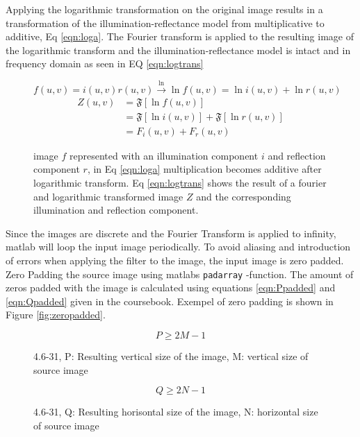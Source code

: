 Applying the logarithmic transformation on the original image results in a transformation of the illumination-reflectance model from multiplicative to additive, Eq \ref{eqn:loga}. The Fourier transform is applied to the resulting image of the logarithmic transform and the illumination-reflectance model is intact and in frequency domain as seen in EQ \ref{eqn:logtrans}
\begin{figure}[h!]
\begin{equation}
  f(u,v) = i(u,v) r(u,v) \xrightarrow{\ln} \ln{f(u,v)} = \ln{i(u,v)} + \ln{r(u,v)} 
  \label{eqn:loga}
\end{equation}
  \begin{equation}
    \begin{split}
      Z(u,v) &= \mathfrak{F} [\ln{f(u,v)}]\\ &= \mathfrak{F}[\ln{i(u,v)}] + \mathfrak{F}[\ln{r(u,v)}]\\ &= F_i(u,v) + F_r(u,v)
    \end{split}
    \label{eqn:logtrans}
  \end{equation}
\caption{image $f$ represented with an illumination component $i$ and reflection component $r$, in Eq \ref{eqn:loga} multiplication becomes additive after logarithmic transform. Eq \ref{eqn:logtrans} shows the result of a fourier and logarithmic transformed image $Z$ and the corresponding illumination and reflection component.}
\end{figure}

Since the images are discrete and the Fourier Transform is applied to infinity, matlab will loop the input image periodically. To avoid aliasing and introduction of errors when applying the filter to the image, the input image is zero padded. Zero Padding the source image using matlabs \verb~padarray~ -function. The amount of zeros padded with the image is calculated using equations \ref{eqn:Ppadded} and \ref{eqn:Qpadded} given in the coursebook\cite[p. 274]{dipBook}. Exempel of zero padding is shown in Figure \ref{fig:zeropadded}.
\begin{figure}[h!]
\begin{equation}
  P \geq 2M -1
  \label{eqn:Ppadded}
\end{equation}
\caption{4.6-31, P: Resulting vertical size of the image, M: vertical size of source image}
\end{figure}

\begin{figure}[h!]
  \begin{equation}
    Q \geq 2N -1
    \label{eqn:Qpadded}
  \end{equation}
  \caption{4.6-31, Q: Resulting horisontal size of the image, N: horizontal size of source image}
\end{figure}

